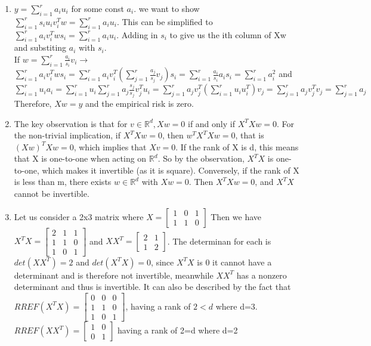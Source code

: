 \documentclass{article}
\theoremstyle{definition}
\theoremstyle{remark}
\begin{document}
\begin{enumerate}[font={\Large\bfseries},left=0pt]
\begin{enumerate}
    \item $y=\sum_{i=1}^{r}a_i u_i$ for some const $a_i$. we want to show $\sum_{i=1}^r s_i u_i v_i^T w = \sum_{i=1}^{r}a_i u_i$. 
    This can be simplified to $\sum_{i=1}^r a_i v_i^T w s_i = \sum_{i=1}^{r}a_i u_i$. Adding in $s_i$ to give us the ith column of
    Xw and substiting $a_i$ with $s_i$.\\
    If $w = \sum_{i=1}^r \frac{a_i}{s_i} v_i \rightarrow$
    $\sum_{i=1}^r a_i v_i^T w s_i = \sum_{i=1}^r a_i v_i^T \left(\sum_{j=1}^r \frac{a_j}{s_j} v_j\right) s_i = 
    \sum_{i=1}^r \frac{a_i}{s_i} a_i s_i = \sum_{i=1}^r a_i^2$ and\\
    $\sum_{i=1}^r u_i a_i = \sum_{i=1}^r u_i \sum_{j=1}^r a_j \frac{s_j}{s_j} v_j^T u_i = \sum_{j=1}^r a_j v_j^T 
    \left(\sum_{i=1}^r u_i u_i^T\right) v_j = \sum_{j=1}^r a_j v_j^T v_j = \sum_{j=1}^r a_j$
    Therefore, $Xw = y$ and the empirical risk is zero.
    
    \item The key observation is that for $v \in \mathbb{R}^d, Xw=0$ if and only if $X^{T}Xw=0$.
    For the non-trivial implication, if $X^TXw=0$, then $w^TX^TXw=0$, that is $(Xw)^TXw=0$, which implies that $Xv=0$.
    If the rank of X is d, this means that X is one-to-one when acting on $\mathbb{R}^d$. 
    So by the observation, $X^TX$ is one-to-one, which makes it invertible (as it is square).
    Conversely, if the rank of X is less than m, there exists $w \in \mathbb{R}^d$ with $Xw=0$. Then $X^TXw=0$, and $X^TX$ cannot be invertible.
    
    \item Let us consider a 2x3 matrix where $X = \left[\begin{array}{ccc} 1 & 0 & 1 \\ 1 & 1 & 0 \end{array} \right]$ Then we have 
    $X^TX =  \left[\begin{array}{ccc} 2 & 1 & 1 \\ 1 & 1 & 0\\ 1 & 0 & 1 \end{array} \right]$ and 
    $XX^T = \left[\begin{array}{cc} 2 & 1\\ 1 & 2 \end{array} \right]$. The determinan for each is $det(XX^T) = 2$ and
    $det(X^TX) = 0$, since $X^TX$ is 0 it cannot have a determinant and is therefore not invertible, meanwhile $XX^T$ has 
    a nonzero determinant and thus is invertible. It can also be described by the fact that 
    $RREF(X^TX) = \left[\begin{array}{ccc} 0 & 0 & 0 \\ 1 & 1 & 0 \\ 1 & 0 & 1 \end{array} \right]$, having a rank of $2<d$ where d=3.
    $RREF(XX^T) = \left[\begin{array}{cc} 1 & 0 \\ 0 & 1 \end{array} \right]$ having a rank of 2=d where d=2
  \end{enumerate}




\end{enumerate}
\end{document}
